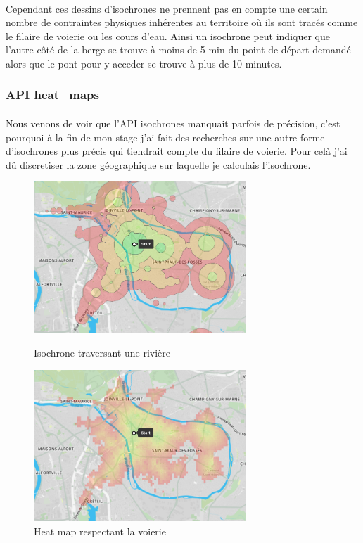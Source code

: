 \documentclass[a4paper]{report}
\begin{document}
\paragraph{} Cependant ces dessins d'isochrones ne prennent pas en compte une certain nombre de contraintes physiques inhérentes au territoire où ils sont tracés comme le filaire de voierie ou les cours d'eau. Ainsi un isochrone peut indiquer que l'autre côté de la berge se trouve à moins de 5 min du point de départ demandé alors que le pont pour y acceder se trouve à plus de 10 minutes.

\subsubsection{API heat\_maps} 

\paragraph{} Nous venons de voir que l'API isochrones manquait parfois de précision, c'est pourquoi à la fin de mon stage j'ai fait des recherches sur une autre forme d'isochrones plus précis qui tiendrait compte du filaire de voierie. Pour celà j'ai dû discretiser la zone géographique sur laquelle je calculais l'isochrone. 

\begin{figure}[H]
	\begin{minipage}[c]{.46\linewidth}
		\includegraphics[width=8cm]{image/comp_iso_fin}
       		\caption{Isochrone traversant une rivière}
		\label{Isochrone traversant une rivière}
	\end{minipage} \hfill
	\begin{minipage}[c]{.46\linewidth}
		\includegraphics[width=8cm]{image/comp_raster_fin}
       		\caption{Heat map respectant la voierie}
		\label{Heat map respectant la voierie}
	\end{minipage}
\end{figure}
\end{document}
